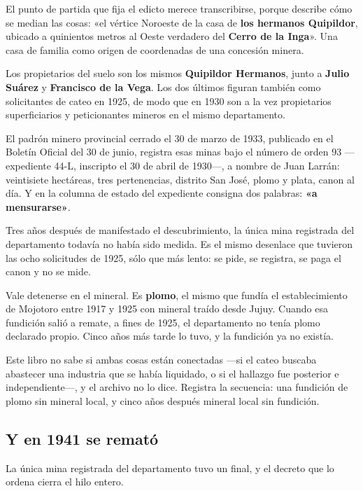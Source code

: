 El punto de partida que fija el edicto merece transcribirse, porque describe cómo se median
las cosas: «el vértice Noroeste de la casa de \textbf{los hermanos Quipildor}, ubicado a
quinientos metros al Oeste verdadero del \textbf{Cerro de la Inga}». Una casa de familia
como origen de coordenadas de una concesión minera.

Los propietarios del suelo son los mismos \textbf{Quipildor Hermanos}, junto a \textbf{Julio
Suárez} y \textbf{Francisco de la Vega}. Los dos últimos figuran también como solicitantes de
cateo en 1925, de modo que en 1930 son a la vez propietarios superficiarios y peticionantes
mineros en el mismo departamento.

El padrón minero provincial cerrado el 30 de marzo de 1933, publicado en el Boletín Oficial del 30 de junio, registra esas minas bajo el número de orden 93 ---expediente 44-L, inscripto el 30 de abril de 1930---, a nombre de Juan Larrán: veintisiete hectáreas, tres pertenencias,
distrito San José, plomo y plata, canon al día. Y en la columna de estado del expediente
consigna dos palabras: \textbf{«a mensurarse»}.

Tres años después de manifestado el descubrimiento, la única mina registrada del departamento
todavía no había sido medida. Es el mismo desenlace que tuvieron las ocho solicitudes de
1925, sólo que más lento: se pide, se registra, se paga el canon y no se mide.

Vale detenerse en el mineral. Es \textbf{plomo}, el mismo que fundía el establecimiento de
Mojotoro entre 1917 y 1925 con mineral traído desde Jujuy. Cuando esa fundición salió a remate,
a fines de 1925, el departamento no tenía plomo declarado propio. Cinco años más tarde
lo tuvo, y la fundición ya no existía.

Este libro no sabe si ambas cosas están conectadas —si el cateo buscaba abastecer una
industria que se había liquidado, o si el hallazgo fue posterior e independiente—, y el
archivo no lo dice. Registra la secuencia: una fundición de plomo sin mineral local, y cinco
años después mineral local sin fundición.

\subsection*{Y en 1941 se remató}

La única mina registrada del departamento tuvo un final, y el decreto que lo ordena cierra el
hilo entero.

